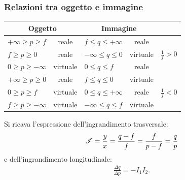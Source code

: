 \subsubsection{Relazioni tra oggetto e immagine}
\begin{center}
\begin{tabularx}{\textwidth}{Xc| Xc |c}
\toprule
\multicolumn{2}{c}{Oggetto} 			& \multicolumn{2}{c}{Immagine} 				& \\
\midrule
$+\infty\ge p\ge f$ 		& reale 		& $f\le q\le +\infty$ 			& reale 		& \\[2ex]
$f\ge p\ge 0$ 			& reale 		& $-\infty\le q\le 0$ 			& virtuale 		& $\frac{1}{f}>0$ \\[2ex]
$0\ge p\ge -\infty$ 		& virtuale 		& $0\le q \le f$ 				& reale 		& \\[2ex]
\midrule
$+\infty\ge p\ge 0$ 		& reale 		& $f\le q\le 0$ 				& virtuale 		& \\[2ex]
$0\ge p\ge f$ 			& virtuale 		& $0\le q\le +\infty$ 			& reale 		& $\frac{1}{f}<0$ \\[2ex]
$f\ge p\ge -\infty$ 		& virtuale 		& $-\infty\le q \le f$ 			& virtuale 		& \\[2ex]
\bottomrule
\end{tabularx}
\end{center}

Si ricava l'espressione dell'\b{ingrandimento trasversale}:
\begin{equation}\begin{split}
\mathcal{I}=\frac{y}{x}=\frac{q-f}{f}=\frac{f}{p-f}=\frac{q}{p}
\end{split}\end{equation}
e dell'\b{ingrandimento longitudinale}:
\begin{equation}\begin{split}
\frac{\Delta q}{\Delta p}=-I_1I_2.
\end{split}\end{equation}

